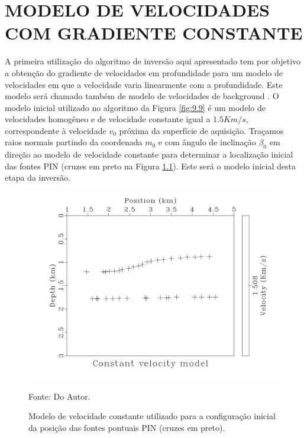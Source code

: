 \chapter{MODELO DE VELOCIDADES COM GRADIENTE CONSTANTE}
\label{cap10}

A primeira utilização do algoritmo de inversão aqui apresentado
tem por objetivo a obtenção do gradiente de
velocidades em profundidade para um modelo de velocidades em que a velocidade varia linearmente com a profundidade. Este modelo será chamado também de modelo de velocidades de background
\cite{niptomo,stereo}.
O modelo inicial utilizado no algoritmo da Figura \ref{fig:9.9}
é um modelo de velocidades homogêneo
e de velocidade constante igual a $1.5Km/s$,
correspondente à velocidade $v_0$ próxima da superfície de aquisição. Traçamos raios normais
partindo da coordenada $m_0$ e com ângulo de inclinação $\beta_0$ em direção ao modelo
de velocidade constante para determinar a localização inicial das fontes PIN (cruzes
em preto na Figura \ref{fig:10.1}). Este será o modelo inicial desta etapa da inversão.

\begin{figure}[H]
\caption{Modelo de velocidade constante utilizado para a configuração inicial da
posição das fontes pontuais PIN (cruzes em preto).}
\begin{center}
\includegraphics[scale=0.3]{images/ctevel.jpeg}
\vspace{-0.3cm}
\end{center}
\begin{center}
 Fonte: Do Autor.
\end{center}
\label{fig:10.1}
\end{figure}

